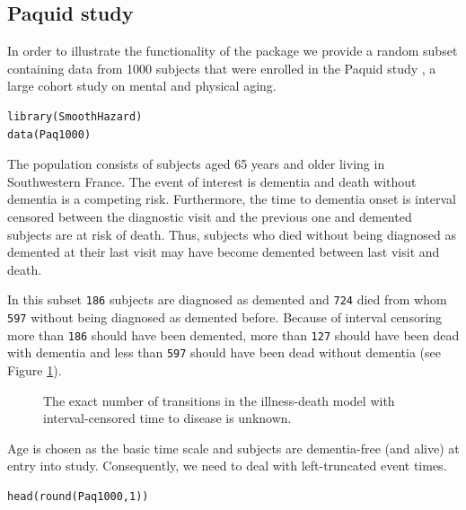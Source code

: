 \documentclass{article}
\begin{document}
\subsection{Paquid study}
\label{sec-5-2}
In order to illustrate the functionality of the package we provide a
random subset containing data from 1000 subjects that were enrolled in
the Paquid study \citep{letenneur1999sex}, a large cohort study on
mental and physical aging.
\lstset{basicstyle=\small\tt,numbers=left,language=R}
\begin{lstlisting}
library(SmoothHazard)
data(Paq1000)
\end{lstlisting}
The population consists of subjects aged 65 years and older living in
Southwestern France. 
The event of interest is dementia and death without
dementia is a competing risk. Furthermore, the time to dementia onset
is interval censored between the diagnostic visit and the previous one 
and demented subjects are at risk of death.
Thus, subjects who died without being diagnosed as demented at their last visit 
may have become demented between last visit and death.

In this subset \texttt{186} subjects are diagnosed as demented
and \texttt{724} died from whom \texttt{597} without
being diagnosed as demented before. Because of interval censoring 
more than \texttt{186} should have been demented, more than
\texttt{127} should have been dead with dementia and
less than \texttt{597} should have been dead without dementia
(see Figure \ref{fig:2}).
\begin{center}
\begin{figure}
\label{fig:2}
\centering
{}
\caption{The exact number of transitions in the illness-death model with interval-censored time to disease is unknown.}
\end{figure}
\end{center}

Age is chosen as the basic time scale and subjects are dementia-free
(and alive) at entry into study.  Consequently, we need to deal with
left-truncated event times.

\lstset{basicstyle=\small\tt,numbers=left,language=R}
\begin{lstlisting}
head(round(Paq1000,1))
\end{lstlisting}
\end{document}

